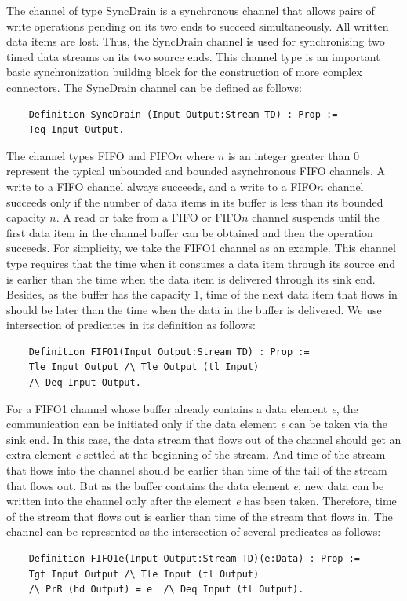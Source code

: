 \documentclass[3p,times]{elsarticle}
\begin{document}
The channel of type SyncDrain is a synchronous channel that allows pairs of write operations pending on its two ends to succeed simultaneously. All written data items are lost. Thus, the SyncDrain channel is used for synchronising two timed data streams on its two source ends. This channel type is an important basic synchronization building block for the construction of more complex connectors. The SyncDrain channel can be defined as follows:
\begin{verbatim}
    Definition SyncDrain (Input Output:Stream TD) : Prop :=
    Teq Input Output.
\end{verbatim}


The channel types FIFO and FIFO$n$ where $n$ is an integer greater than $0$ represent the
typical unbounded and bounded asynchronous FIFO channels. A write to a FIFO channel always succeeds, and a write to a FIFO$n$ channel succeeds only if the
number of data items in its buffer is less than its bounded capacity $n$. A read or take from a FIFO or FIFO$n$ channel suspends until the first data item
in the channel buffer can be obtained and then the operation succeeds.
For simplicity, we take the FIFO1 channel as an example. This channel type requires that the time when it consumes a data item through its source end is earlier than the time when the data item is delivered through its sink end. Besides, as the buffer has the capacity 1, time of the next data item that flows in should be later than the time when the data in the buffer is delivered. We use intersection of predicates in its definition as follows:
\begin{verbatim}
    Definition FIFO1(Input Output:Stream TD) : Prop :=
    Tle Input Output /\ Tle Output (tl Input)
    /\ Deq Input Output.
\end{verbatim}

For a FIFO1 channel whose buffer already contains a data element \emph{e}, the communication can be initiated only if the data element \emph{e} can be taken via the sink end. In this case, the data stream that flows out of the channel should get an extra element \emph{e} settled at the beginning of the stream. And time of the stream that flows into the channel should be earlier than time of the tail of the stream that flows out. But as the buffer contains the data element \emph{e}, new data can be written into the channel only after the element \emph{e} has been taken. Therefore, time of the stream that flows out is earlier than time of the stream that flows in. The channel can be represented as the intersection of several predicates as follows:
\begin{verbatim}
    Definition FIFO1e(Input Output:Stream TD)(e:Data) : Prop :=
    Tgt Input Output /\ Tle Input (tl Output)
    /\ PrR (hd Output) = e  /\ Deq Input (tl Output).
\end{verbatim}
\end{document}
